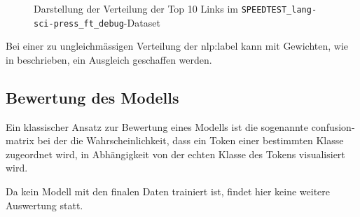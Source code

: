 \begin{figure}
	\begin{adjustbox}{center,max width=0.9\linewidth,max totalheight=0.9\textheight}
		
	\end{adjustbox}
	\caption{Darstellung der Verteilung der Top 10 Links im \texttt{SPEEDTEST\_lang-sci-press\_ft\_debug}-Dataset}
	\label{fig:statistics:links}
\end{figure}


\citeauthor{1906.01378}
Bei einer zu ungleichmässigen Verteilung der \gls{nlp:label} kann mit Gewichten,
wie in \autocite[Loss Definition]{1906.01378} beschrieben,
ein Ausgleich geschaffen werden.


\subsection{Bewertung des Modells}

Ein klassischer Ansatz zur Bewertung eines Modells ist die sogenannte \gls{confusion-matrix}
bei der die Wahrscheinlichkeit,
dass ein Token einer bestimmten Klasse zugeordnet wird,
in Abhängigkeit von der echten Klasse des Tokens visualisiert wird.

Da kein Modell mit den finalen Daten trainiert ist,
findet hier keine weitere Auswertung statt.
